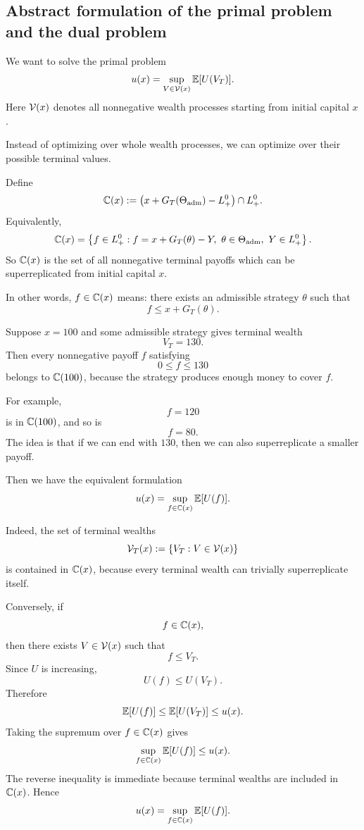 \subsection{Abstract formulation of the primal problem and the dual problem}

We want to solve the primal problem
\[
    u(x)=\sup_{V\in\mathcal{V}(x)}\mathbb{E}[U(V_T)].
\]
Here $\mathcal{V}(x)$ denotes all nonnegative wealth processes starting from initial capital $x$.

Instead of optimizing over whole wealth processes, we can optimize over their possible terminal values.

\begin{definicija}
Define
\[
    \mathbb{C}(x)
    :=
    \bigl(x+G_T(\Theta_{\mathrm{adm}})-L_+^0\bigr)
    \cap L_+^0.
\]
Equivalently,
\[
    \mathbb{C}(x)
    =
    \left\{
        f\in L_+^0:
        f=x+G_T(\theta)-Y,
        \ \theta\in\Theta_{\mathrm{adm}},
        \ Y\in L_+^0
    \right\}.
\]
So $\mathbb{C}(x)$ is the set of all nonnegative terminal payoffs which can be superreplicated from initial capital $x$.

In other words, $f\in\mathbb{C}(x)$ means:
there exists an admissible strategy $\theta$ such that
\[
    f\leq x+G_T(\theta).
\]
\end{definicija}

\begin{primer}
Suppose $x=100$ and some admissible strategy gives terminal wealth
\[
    V_T=130.
\]
Then every nonnegative payoff $f$ satisfying
\[
    0\leq f\leq 130
\]
belongs to $\mathbb{C}(100)$, because the strategy produces enough money to cover $f$.

For example,
\[
    f=120
\]
is in $\mathbb{C}(100)$, and so is
\[
    f=80.
\]
The idea is that if we can end with $130$, then we can also superreplicate a smaller payoff.
\end{primer}

Then we have the equivalent formulation
\[
    u(x)
    =
    \sup_{f\in\mathbb{C}(x)}
    \mathbb{E}[U(f)].
\]

Indeed, the set of terminal wealths
\[
    \mathcal{V}_T(x):=\{V_T:V\in\mathcal{V}(x)\}
\]
is contained in $\mathbb{C}(x)$, because every terminal wealth can trivially superreplicate itself.

Conversely, if
\[
    f\in\mathbb{C}(x),
\]
then there exists $V\in\mathcal{V}(x)$ such that
\[
    f\leq V_T.
\]
Since $U$ is increasing,
\[
    U(f)\leq U(V_T).
\]
Therefore
\[
    \mathbb{E}[U(f)]
    \leq
    \mathbb{E}[U(V_T)]
    \leq
    u(x).
\]
Taking the supremum over $f\in\mathbb{C}(x)$ gives
\[
    \sup_{f\in\mathbb{C}(x)}\mathbb{E}[U(f)]
    \leq u(x).
\]
The reverse inequality is immediate because terminal wealths are included in $\mathbb{C}(x)$. Hence
\[
    u(x)
    =
    \sup_{f\in\mathbb{C}(x)}
    \mathbb{E}[U(f)].
\]


